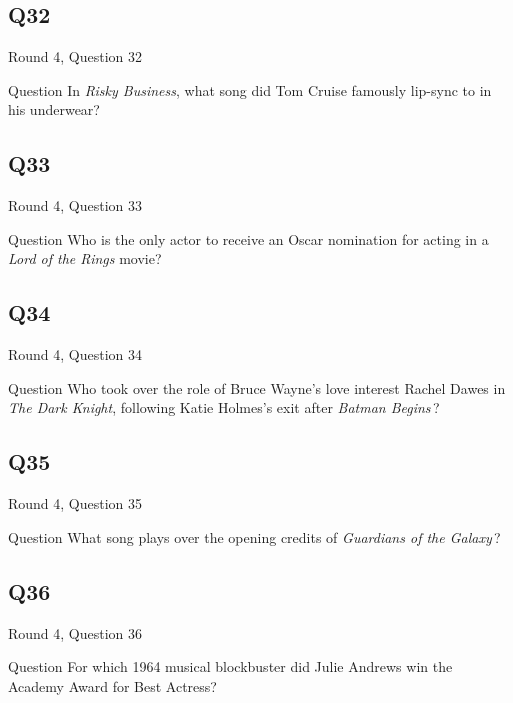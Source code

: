 \documentclass[11pt]{beamer}
\begin{document}
\subsection*{Q32}
\begin{frame}[t]{Round 4, Question 32}
\vspace{2em}
\begin{block}{Question}
In \emph{Risky Business}, what song did Tom Cruise famously lip-sync to in his underwear?
\end{block}
\end{frame}
    

\subsection*{Q33}
\begin{frame}[t]{Round 4, Question 33}
\vspace{2em}
\begin{block}{Question}
Who is the only actor to receive an Oscar nomination for acting in a \emph{Lord of the Rings} movie?
\end{block}
\end{frame}
    

\subsection*{Q34}
\begin{frame}[t]{Round 4, Question 34}
\vspace{2em}
\begin{block}{Question}
Who took over the role of Bruce Wayne's love interest Rachel Dawes in \emph{The Dark Knight}, following Katie Holmes's exit after \emph{Batman Begins}\,?
\end{block}
\end{frame}
    

\subsection*{Q35}
\begin{frame}[t]{Round 4, Question 35}
\vspace{2em}
\begin{block}{Question}
What song plays over the opening credits of \emph{Guardians of the Galaxy}\,?
\end{block}
\end{frame}
    

\subsection*{Q36}
\begin{frame}[t]{Round 4, Question 36}
\vspace{2em}
\begin{block}{Question}
For which 1964 musical blockbuster did Julie Andrews win the Academy Award for Best Actress?
\end{block}
\end{frame}
    
\end{document}
